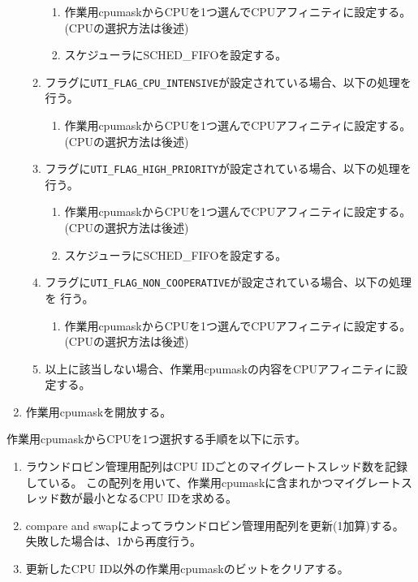 \documentclass[twoside,11pt,fleqn]{book}
\begin{document}
\begin{enumerate}
\begin{enumerate}
\begin{enumerate}
\item 作業用cpumaskからCPUを1つ選んでCPUアフィニティに設定する。
(CPUの選択方法は後述)
\item スケジューラにSCHED\_FIFOを設定する。
\end{enumerate}
\item フラグに\texttt{UTI\_FLAG\_CPU\_INTENSIVE}が設定されている場合、以下の処理を
行う。
\begin{enumerate}
\item 作業用cpumaskからCPUを1つ選んでCPUアフィニティに設定する。
(CPUの選択方法は後述)
\end{enumerate}
\item フラグに\texttt{UTI\_FLAG\_HIGH\_PRIORITY}が設定されている場合、以下の処理を
行う。
\begin{enumerate}
\item 作業用cpumaskからCPUを1つ選んでCPUアフィニティに設定する。
(CPUの選択方法は後述)
\item スケジューラにSCHED\_FIFOを設定する。
\end{enumerate}
\item フラグに\texttt{UTI\_FLAG\_NON\_COOPERATIVE}が設定されている場合、以下の処理を
行う。
\begin{enumerate}
\item 作業用cpumaskからCPUを1つ選んでCPUアフィニティに設定する。
(CPUの選択方法は後述)
\end{enumerate}
\item 以上に該当しない場合、作業用cpumaskの内容をCPUアフィニティに設定する。
\end{enumerate}
\item 作業用cpumaskを開放する。
\end{enumerate}


作業用cpumaskからCPUを1つ選択する手順を以下に示す。
\begin{enumerate}
\item ラウンドロビン管理用配列はCPU IDごとのマイグレートスレッド数を記録している。
この配列を用いて、作業用cpumaskに含まれかつマイグレートスレッド数が最小となるCPU IDを求める。
\item compare and swapによってラウンドロビン管理用配列を更新(1加算)する。
失敗した場合は、1から再度行う。
\item 更新したCPU ID以外の作業用cpumaskのビットをクリアする。
\end{enumerate}
\end{document}
